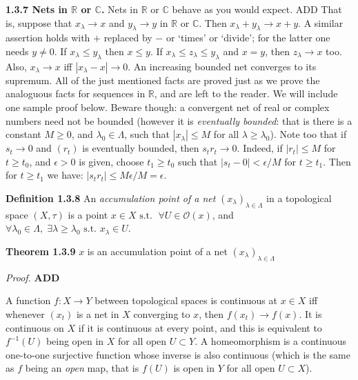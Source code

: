 \documentclass[12pt]{article}
\newcommand{\st}[0]{ \textrm{ s.t. } }
\newcommand{\reals}[0] { \mathbb{R}}
\newcommand{\Cdb}[0] { \mathbb{C}}
\newcommand{\lam}[0] {  \lambda }
\newcommand{\Lam}[0] {  \Lambda }
\newcommand{\curlyO}[0] { \mathcal{O} }
\begin{document}
{\bf   1.3.7
 Nets in $\reals$ or $\Cdb$.}  Nets in $\reals$ or $\Cdb$
behave as you would expect.   ADD That is, suppose that  $x_\lambda
\to x$ and $y_\lambda \to y$ in $\reals$ or $\Cdb$. Then $x_\lambda
+ y_\lambda \to x + y$.  A similar assertion holds with $+$ replaced
by $-$ or `times' or `divide'; for the latter one needs $y \neq 0$.
If $x_\lambda \leq y_\lambda$ then $x \leq y$. If $x_\lambda \leq
z_\lambda \leq y_\lambda$ and $x = y$, then $z_\lambda \to x$ too.
Also, $x_\lambda \to x$ iff $|x_\lambda - x| \to 0$. An increasing
bounded net converges to its supremum. All of the just mentioned
facts are proved just as we prove the analoguous facts for sequences
in $\reals$, and are left to the reader.  We will include one sample
proof below.    Beware though: a convergent net of real or complex
  numbers need not
be bounded (however it is {\em eventually bounded}: that is there is
a constant $M \geq 0$, and $\lambda_0 \in \Lambda$, such that
$|x_\lambda| \leq M$ for all $\lambda \geq \lambda_0$). Note too
that if $s_t \to 0$ and $(r_t)$ is eventually bounded, then $s_t r_t
\to 0$. Indeed, if  $|r_t| \leq M$ for $t \geq t_0$, and $\epsilon >
0$ is given, choose $t_1 \geq t_0$ such that $|s_t - 0| <
\epsilon/M$ for $t \geq t_1$. Then for $t \geq t_1$ we have: $|s_t
r_t | \leq M \epsilon/M = \epsilon$.

\begin{flushleft} {\bf Definition 1.3.8} An \emph{accumulation point of a net} $(x_\lambda)_{\lambda \in \Lambda}$ in a topological space $(X, \tau)$ is a point $x \in X \st \; \forall U \in \curlyO(x)$, and $\forall \lambda_0 \in \Lambda, \; \exists \lambda \ge \lambda_0 \st x_\lambda \in U$.
\end{flushleft}


\begin{flushleft} {\bf Theorem 1.3.9} $x$ is an accumulation point of a net $(x_\lam)_{\lam \in \Lam}$
\end{flushleft}

\begin{flushleft} \emph{Proof. } { \bf ADD }
\end{flushleft}



 A function $f : X \to Y$ between
topological spaces is continuous at $x \in X$ iff whenever $(x_t)$
is a net in $X$ converging to $x$, then $f(x_t) \to f(x)$. It is
continuous on $X$ if it is continuous at every point, and this is
equivalent to $f^{-1}(U)$ being open in $X$ for all open $U \subset
Y$. A homeomorphism is a continuous one-to-one surjective function
whose inverse is also continuous (which is the same as $f$ being an
{\em open} map, that is $f(U)$ is open in $Y$ for all open $U
\subset X$).
\end{document}
